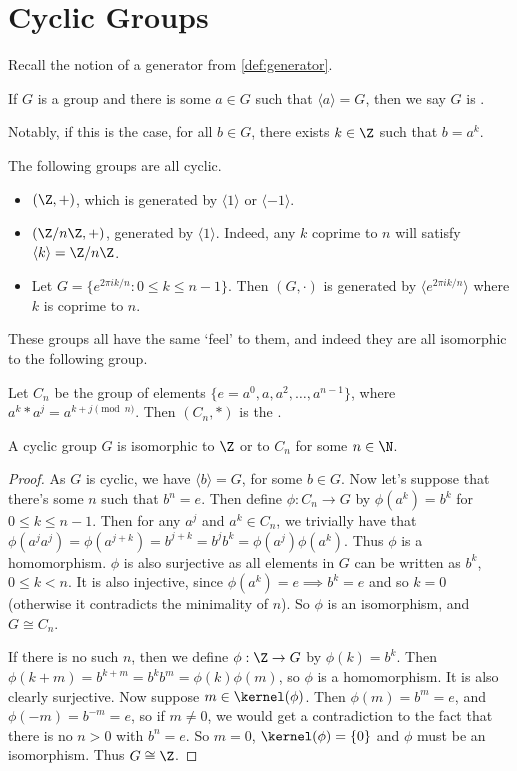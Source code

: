 \documentclass[a4]{scrreprt}
\newcommand{\newsection}{\section}
\begin{document}
\newsection{Cyclic Groups}

Recall the notion of a generator from \autoref{def:generator}.

\begin{definition}[Cyclic]
	If $G$ is a group and there is some $a \in G$ such that $\langle a \rangle = G$, then we say $G$ is . 
\end{definition}
Notably, if this is the case, for all $b \in G$, there exists $k \in \Z$ such that $b = a^k$.

\begin{example}
	The following groups are all cyclic.
	\begin{itemize}
		\item $(\Z, +)$, which is generated by $\langle 1 \rangle$ or $\langle -1 \rangle$.
		\item $(\Z/n\Z, +)$, generated by $\langle 1 \rangle$. Indeed, any $k$ coprime to $n$ will satisfy $\langle k \rangle = \Z/n\Z$.
		\item Let $G = \{ e^{2 \pi i k/n}  : 0 \leq k \leq n - 1 \}$. Then $(G, \cdot)$ is generated by $\langle e^{2 \pi i k/n}\rangle$ where $k$ is coprime to $n$.
	\end{itemize}
\end{example}
These groups all have the same `feel' to them, and indeed they are all isomorphic to the following group.

\begin{definition}
	Let $C_n$ be the group of elements $\{e = a^0, a, a^2, \dots, a^{n - 1}\}$, where $a^k * a^j = a^{k + j \pmod{n}}$. Then $(C_n, *)$ is the .
\end{definition}

\begin{theorem}
	A cyclic group $G$ is isomorphic to $\Z$ or to $C_n$ for some $n \in \N$.
\end{theorem}
\begin{proof}
	As $G$ is cyclic, we have $\langle b \rangle = G$, for some $b \in G$.
	Now let's suppose that there's some $n$ such that $b^n = e$. Then define $\phi: C_n \rightarrow G$ by $\phi(a^k) = b^k$ for $0 \leq k \leq n - 1$.
	Then for any $a^j$ and $a^k \in C_n$, we trivially have that $\phi(a^j a^j) = \phi(a^{j + k}) = b^{j + k} = b^j b^k = \phi(a^j) \phi(a^k)$. Thus $\phi$ is a homomorphism.
	$\phi$ is also surjective as all elements in $G$ can be written as $b^k$, $0 \leq k < n$. It is also injective, since $\phi(a^k) = e \implies b^k = e$ and so $k = 0$ (otherwise it contradicts the minimality of $n$). So $\phi$ is an isomorphism, and $G \cong C_n$.

	If there is no such $n$, then we define $\phi : \Z \rightarrow G$ by $\phi(k) = b^k$. Then $\phi(k + m) = b^{k + m} = b^k b^m = \phi(k) \phi(m)$, so $\phi$ is a homomorphism. It is also clearly surjective.
	Now suppose $m \in \kernel(\phi)$. Then $\phi(m) = b^m = e$, and $\phi(-m) = b^{-m} = e$, so if $m \neq 0$, we would get a contradiction to the fact that there is no $n > 0$ with $b^n = e$. So $m = 0$, $\kernel(\phi) = \{0\}$ and $\phi$ must be an isomorphism. Thus $G \cong \Z$.
\end{proof}
\end{document}
